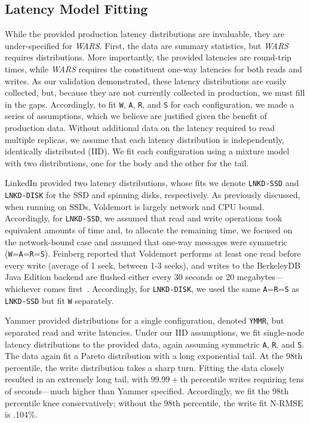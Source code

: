 \documentclass{vldb}
\begin{document}
\subsection{Latency Model Fitting}

While the provided production latency distributions are invaluable,
they are under-specified for \textit{WARS}.  First, the data are
summary statistics, but \textit{WARS} requires distributions.  More
importantly, the provided latencies are round-trip times, while
\textit{WARS} requires the constituent one-way latencies for both
reads and writes.  As our validation demonstrated, these latency
distributions are easily collected, but, because they are not
currently collected in production, we must fill in the
gaps. Accordingly, to fit \texttt{W}, \texttt{A}, \texttt{R}, and
\texttt{S} for each configuration, we made a series of assumptions,
which we believe are justified given the benefit of production data.
Without additional data on the latency required to read multiple
replicas, we assume that each latency distribution is independently,
identically distributed (IID).  We fit each configuration using a
mixture model with two distributions, one for the body and the other
for the tail.

LinkedIn provided two latency distributions, whose fits we denote
\texttt{LNKD-SSD} and \texttt{LNKD-DISK} for the SSD and spinning
disks, respectively.  As previously discussed, when running on SSDs,
Voldemort is largely network and CPU bound.  Accordingly, for
\texttt{LNKD-SSD}, we assumed that read and write operations took
equivalent amounts of time and, to allocate the remaining time, we
focused on the network-bound case and assumed that one-way messages
were symmetric (\texttt{W}=\texttt{A}=\texttt{R}=\texttt{S}). Feinberg
reported that Voldemort performs at least one read before every write
(average of 1 seek, between 1-3 seeks), and writes to the BerkeleyDB
Java Edition backend are flushed either every 30 seconds or 20
megabytes---whichever comes first~\cite{feinbergpc}.  Accordingly, for
\texttt{LNKD-DISK}, we used the same \texttt{A}=\texttt{R}=\texttt{S}
as \texttt{LNKD-SSD} but fit \texttt{W} separately.

Yammer provided distributions for a single configuration, denoted
\texttt{YMMR}, but separated read and write latencies.  Under our IID
assumptions, we fit single-node latency distributions to the provided
data, again assuming symmetric \texttt{A}, \texttt{R}, and \texttt{S}.
The data again fit a Pareto distribution with a long exponential tail.
At the $98$th percentile, the write distribution takes a sharp turn.
Fitting the data closely resulted in an extremely long tail, with
$99.99+$th percentile writes requiring tens of seconds---much higher
than Yammer specified.  Accordingly, we fit the $98$th percentile knee
conservatively; without the $98$th percentile, the write fit N-RMSE is
.104\%.
\end{document}
